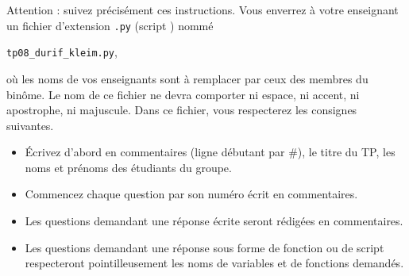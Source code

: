 Attention : suivez précisément ces instructions. Vous enverrez à votre enseignant un fichier d'extension  \texttt{.py} (script \python) nommé
\begin{center}
  \texttt{tp08\_durif\_kleim.py},
\end{center}
 où les noms de vos enseignants sont à remplacer par ceux des membres du binôme. Le nom de ce 
fichier ne devra comporter ni espace, ni accent, ni apostrophe, ni majuscule.
Dans ce fichier, vous respecterez les consignes suivantes.
\begin{itemize}
  \item \'Ecrivez d'abord en commentaires (ligne débutant par \#), le titre du TP, les noms et prénoms des étudiants du groupe.
  \item Commencez chaque question par son numéro écrit en commentaires.
  \item Les questions demandant une réponse écrite seront rédigées en commentaires.
  \item Les questions demandant une réponse sous forme de fonction ou de script respecteront pointilleusement les noms de variables et de fonctions demandés.
\end{itemize}